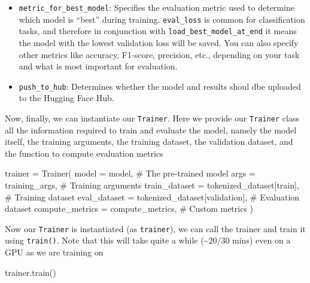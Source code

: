 \documentclass[
  letterpaper,
  DIV=11,
  numbers=noendperiod]{scrreprt}
\newenvironment{Shaded}{\begin{snugshade}}{\end{snugshade}}
\newcommand{\CommentTok}[1]{\textcolor[rgb]{0.37,0.37,0.37}{#1}}
\newcommand{\NormalTok}[1]{\textcolor[rgb]{0.00,0.23,0.31}{#1}}
\newcommand{\OperatorTok}[1]{\textcolor[rgb]{0.37,0.37,0.37}{#1}}
\newcommand{\StringTok}[1]{\textcolor[rgb]{0.13,0.47,0.30}{#1}}
\begin{document}
\begin{itemize}
\item
  \texttt{metric\_for\_best\_model}: Specifies the evaluation metric
  used to determine which model is ``best'' during training.
  \texttt{eval\_loss} is common for classification tasks, and therefore
  in conjunction with \texttt{load\_best\_model\_at\_end} it means the
  model with the lowest validation loss will be saved. You can also
  specify other metrics like accuracy, F1-score, precision, etc.,
  depending on your task and what is most important for evaluation.
\item
  \texttt{push\_to\_hub}: Determines whether the model and results shoul
  dbe uploaded to the Hugging Face Hub.
\end{itemize}

Now, finally, we can instantiate our \texttt{Trainer}. Here we provide
our \texttt{Trainer} class all the information required to train and
evaluate the model, namely the model itself, the training arguments, the
training dataset, the validation dataset, and the function to compute
evaluation metrics

\begin{Shaded}
\begin{Highlighting}[]
\NormalTok{trainer }\OperatorTok{=}\NormalTok{ Trainer(}
\NormalTok{    model }\OperatorTok{=}\NormalTok{ model,                         }\CommentTok{\# The pre{-}trained model}
\NormalTok{    args }\OperatorTok{=}\NormalTok{ training\_args,                  }\CommentTok{\# Training arguments}
\NormalTok{    train\_dataset }\OperatorTok{=}\NormalTok{ tokenized\_dataset[}\StringTok{\textquotesingle{}train\textquotesingle{}}\NormalTok{],  }\CommentTok{\# Training dataset}
\NormalTok{    eval\_dataset }\OperatorTok{=}\NormalTok{ tokenized\_dataset[}\StringTok{\textquotesingle{}validation\textquotesingle{}}\NormalTok{],  }\CommentTok{\# Evaluation dataset}
\NormalTok{    compute\_metrics }\OperatorTok{=}\NormalTok{ compute\_metrics,     }\CommentTok{\# Custom metrics}
\NormalTok{)}
\end{Highlighting}
\end{Shaded}

Now our \texttt{Trainer} is instantiated (as \texttt{trainer}), we can
call the trainer and train it using \texttt{train()}. Note that this
will take quite a while (\textasciitilde20/30 mins) even on a GPU as we
are training on

\begin{Shaded}
\begin{Highlighting}[]
\NormalTok{trainer.train()}
\end{Highlighting}
\end{Shaded}
\end{document}
